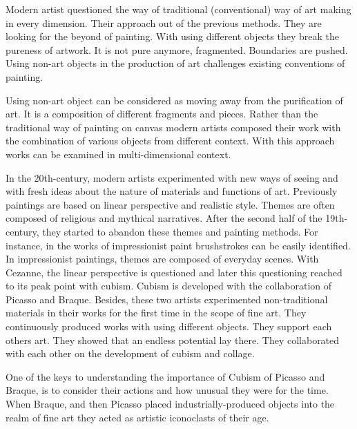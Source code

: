 Modern artist questioned the way of traditional (conventional) way of art making in every dimension. Their approach out of the previous methods. They are looking for the beyond of painting. With using different objects they break the pureness of artwork. It is not pure anymore, fragmented. Boundaries are pushed. Using non-art objects in the production of art challenges existing conventions of painting. 

Using non-art object can be considered as moving away from the purification of art. It is a composition of different fragments and pieces. Rather than the traditional way of painting on canvas modern artists composed their work with the combination of various objects from different context. With this approach works can be examined in multi-dimensional context.


In the 20th-century, modern artists experimented with new ways of seeing and with fresh ideas about the nature of materials and functions of art. Previously paintings are based on linear perspective and realistic style. Themes are often composed of religious and mythical narratives. After the second half of the 19th-century, they started to abandon these themes and painting methods. For instance, in the works of impressionist paint brushstrokes can be easily identified. In impressionist paintings, themes are composed of everyday scenes. With Cezanne, the linear perspective is questioned and later this questioning reached to its peak point with cubism. Cubism is developed with the collaboration of Picasso and Braque. Besides, these two artists experimented non-traditional materials in their works for the first time in the scope of fine art. They continuously produced works with using different objects. They support each others art. They showed that an endless potential lay there. They collaborated with each other on the development of cubism and collage.

One of the keys to understanding the importance of Cubism of Picasso and Braque, is to consider their actions and how unusual they were for the time. When Braque, and then Picasso placed industrially-produced objects into the realm of fine art they acted as artistic iconoclasts of their age. 

